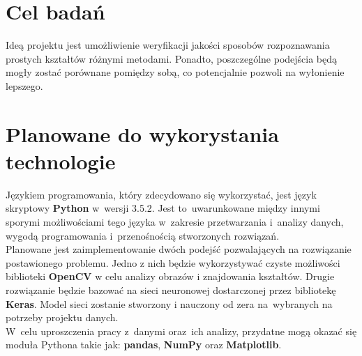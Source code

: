 \documentclass[11pt,a4paper]{article}
\begin{document}
\section{Cel badań} %

Ideą projektu jest umożliwienie weryfikacji jakości sposobów rozpoznawania prostych kształtów różnymi metodami. Ponadto, poszczególne podejścia będą mogły zostać porównane pomiędzy sobą, co potencjalnie pozwoli na wyłonienie lepszego.

\section{Planowane do wykorystania technologie}

Językiem programowania, który zdecydowano się wykorzystać, jest język skryptowy \textbf{Python} w~wersji 3.5.2.
Jest to~uwarunkowane między innymi sporymi możliwościami tego języka w~zakresie przetwarzania i~analizy danych, wygodą programowania i~przenośnością stworzonych rozwiązań.\\

Planowane jest zaimplementowanie dwóch podejść pozwalających na rozwiązanie postawionego problemu. Jedno z nich będzie wykorzystywać czyste możliwości biblioteki \textbf{OpenCV} w celu analizy obrazów i znajdowania kształtów. Drugie rozwiązanie będzie bazować na sieci neuronowej dostarczonej przez bibliotekę \textbf{Keras}. Model sieci zostanie stworzony i nauczony od zera na~wybranych na potrzeby projektu danych.\\

W~celu uproszczenia pracy z~danymi oraz~ich analizy, przydatne mogą okazać się moduła Pythona takie jak: \textbf{pandas}, \textbf{NumPy} oraz \textbf{Matplotlib}.\\
\end{document}
